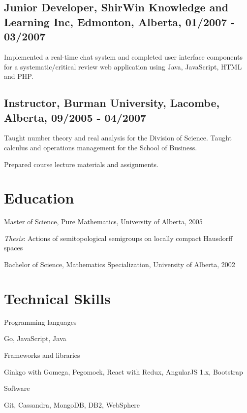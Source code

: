 \documentclass[10.5pt, letterpaper]{article}
\renewenvironment{itemize}{
  \begin{list}{}{
    \setlength{\leftmargin}{1.5em}
  }
}{
  \end{list}
}
\begin{document}
\subsection*{Junior Developer, ShirWin Knowledge and Learning Inc, Edmonton, Alberta, 01/2007 - 03/2007}
\begin{itemize}
\item Implemented a real-time chat system and completed user interface components for a systematic/critical review web application using Java, JavaScript, HTML and PHP.
\end{itemize}

\subsection*{Instructor, Burman University, Lacombe, Alberta, 09/2005 - 04/2007}
\begin{itemize}
\item Taught number theory and real analysis for the Division of Science.  Taught calculus and operations management for the School of Business.
\item Prepared course lecture materials and assignments.
\end{itemize}

\section*{Education}

\begin{itemize}
  \item Master of Science, Pure Mathematics, University of Alberta, 2005
    \begin{itemize}
    \item\textit{Thesis}: Actions of semitopological semigroups on locally compact Hausdorff spaces
    \end{itemize}

  \item Bachelor of Science, Mathematics Specialization, University of Alberta, 2002
\end{itemize}

\section*{Technical Skills}
\begin{itemize}
\item Programming languages 
  \begin{itemize}
    \item Go, JavaScript, Java
  \end{itemize}
\item Frameworks and libraries
    \begin{itemize}
        \item Ginkgo with Gomega, Pegomock, React with Redux, AngularJS 1.x, Bootstrap
    \end{itemize}
\item Software
  \begin{itemize}
      \item Git, Cassandra, MongoDB, DB2, WebSphere
  \end{itemize}
\end{itemize}
\bigskip
\end{document}

